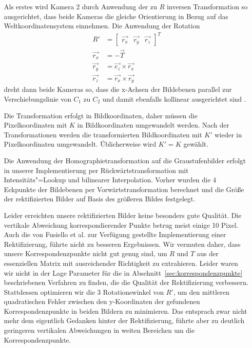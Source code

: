 Als erstes wird Kamera 2 durch Anwendung der zu $R$ inversen Transformation so ausgerichtet, dass beide Kameras die gleiche Orientierung in Bezug auf das Weltkoordinatensystem einnehmen. Die Anwendung der Rotation
\begin{align}
	R' &= \begin{bmatrix}
		\vec{r_x} & \vec{r_y} & \vec{r_z}	
	\end{bmatrix}^T\\
	\vec{r_x} &= -\vec{T}\\
	\vec{r_y} &= \vec{e_z} \times \vec{r_x}\\
	\vec{r_z} &= \vec{r_x} \times \vec{r_y}
\end{align}
dreht dann beide Kameras so, dass die x-Achsen der Bildebenen parallel zur Verschiebungslinie von $C_1$ zu $C_2$ und damit ebenfalls kollinear ausgerichtet sind \cite[S. 40]{Morvan}.

Die Transformation erfolgt in Bildkoordinaten, daher müssen die Pixelkoordinaten mit $K$ in Bildkoordinaten umgewandelt werden. Nach der Transformationen werden die transformierten Bildkoordinaten mit $K'$ wieder in Pixelkoordinaten umgewandelt. Üblicherweise wird $K' = K$ gewählt.

Die Anwendung der Homographietransformation auf die Graustufenbilder erfolgt in unserer Implementierung per Rückwärtstransformation mit Intensitäts"=Lookup und bilinearer Interpolation. Vorher wurden die 4 Eckpunkte der Bildebenen per Vorwärtstransformation berechnet und die Größe der rektifizierten Bilder auf Basis des größeren Bildes festgelegt.

Leider erreichten unsere rektifizierten Bilder keine besonders gute Qualität. Die vertikale Abweichung korrespondierender Punkte betrug meist einige 10 Pixel. Auch die von Fusiello et al. zur Verfügung gestellte Implementierung einer Rektifizierung, führte nicht zu besseren Ergebnissen. Wir vermuten daher, dass unsere Korrespondenzpunkte nicht gut genug sind, um $R$ und $T$ aus der essenziellen Matrix mit ausreichender Richtigkeit zu extrahieren. Leider waren wir nicht in der Lage Parameter für die in Abschnitt~\ref{sec:korrespondenzpunkte} beschriebenen Verfahren zu finden, die die Qualität der Rektifizierung verbessern. Stattdessen optimieren wir die 3 Rotationswinkel von $R'$, um den mittleren quadratischen Fehler zwischen den y-Koordinaten der gefundenen Korrespondenzpunkte in beiden Bildern zu minimieren. Das entsprach zwar nicht mehr dem eigentlich Gedanken hinter der Rektifizierung, führte aber zu deutlich geringeren vertikalen Abweichungen in weiten Bereichen um die Korrespondenzpunkte.

